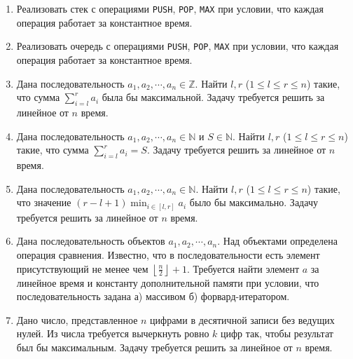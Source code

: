 \section{}

\begin{enumerate}

  \item Реализовать стек с операциями \texttt{PUSH}, \texttt{POP}, \texttt{MAX}
        при условии, что каждая операция работает за константное время.

  \item Реализовать очередь с операциями \texttt{PUSH}, \texttt{POP}, \texttt{MAX}
        при условии, что каждая операция работает за константное время.

  \item Дана последовательность $a_1, a_2, \cdots, a_n \in \mathbb{Z}$.
        Найти $l, r$ ($1 \leq l \leq r \leq n$) такие, что сумма $\sum_{i = l}^r a_i$
        была бы максимальной. Задачу требуется решить за линейное от $n$ время.

  \item Дана последовательность $a_1, a_2, \cdots, a_n \in \mathbb{N}$ и $S \in \mathbb{N}$.
        Найти $l, r$ ($1 \leq l \leq r \leq n$) такие, что сумма $\sum_{i = l}^r a_i = S$.
        Задачу требуется решить за линейное от $n$ время.

  \item Дана последовательность $a_1, a_2, \cdots, a_n \in \mathbb{N}$.
    Найти $l, r$ ($1 \leq l \leq r \leq n$) такие, что значение $(r - l + 1) \min_{i \in [l, r]} a_i$
    было бы максимально. Задачу требуется решить за линейное от $n$ время.

  \item Дана последовательность объектов $a_1, a_2, \cdots, a_n$. Над объектами определена операция
        сравнения. Известно, что в последовательности есть элемент присутствующий не менее
        чем $\left\lfloor \frac{n}{2} \right\rfloor + 1$. Требуется найти элемент $a$ за линейное время
        и константу дополнительной памяти при условии, что последовательность задана а) массивом
        б) форвард-итератором.

  \item Дано число, представленное $n$ цифрами в десятичной записи без ведущих нулей.
      Из числа требуется вычеркнуть ровно $k$ цифр так, чтобы результат был бы максимальным.
      Задачу требуется решить за линейное от $n$ время.


\end{enumerate}
